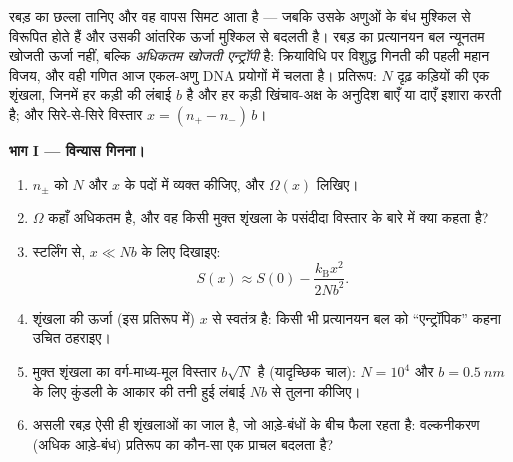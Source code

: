 \begin{problem}\label{pb:b3:microcanonical-ensemble:1}
रबड़ का छल्ला तानिए और वह वापस सिमट आता है --- जबकि उसके अणुओं के
बंध मुश्किल से विरूपित होते हैं और उसकी आंतरिक ऊर्जा मुश्किल से
बदलती है। रबड़ का प्रत्यानयन बल न्यूनतम खोजती ऊर्जा नहीं, बल्कि
\emph{अधिकतम खोजती एन्ट्रॉपी} है: क्रियाविधि पर विशुद्ध गिनती की
पहली महान विजय, और वही गणित आज एकल-अणु DNA प्रयोगों में चलता है।
प्रतिरूप: $N$ दृढ़ कड़ियों की एक शृंखला,
जिनमें हर कड़ी की लंबाई $b$ है और हर कड़ी खिंचाव-अक्ष के अनुदिश बाएँ
या दाएँ इशारा करती है; और सिरे-से-सिरे विस्तार $x = (n_+ - n_-)\,b$।

\medskip\noindent\textbf{भाग I --- विन्यास गिनना।}
\begin{enumerate}
  \item $n_\pm$ को $N$ और $x$ के पदों में व्यक्त कीजिए, और
         $\Omega(x)$ लिखिए।
  \item $\Omega$ कहाँ अधिकतम है, और वह किसी मुक्त शृंखला के पसंदीदा
        विस्तार के बारे में क्या कहता है?
  \item स्टर्लिंग से, $x \ll Nb$ के लिए दिखाइए:
        \[
        S(x) \approx S(0) - \frac{k_{\text{B}}x^2}{2Nb^2} .
        \]
  \item शृंखला की ऊर्जा (इस प्रतिरूप में) $x$ से स्वतंत्र है:
        किसी भी प्रत्यानयन बल को ``एन्ट्रॉपिक'' कहना उचित ठहराइए।
  \item मुक्त शृंखला का वर्ग-माध्य-मूल विस्तार $b\sqrt N$ है
        (यादृच्छिक चाल): $N = 10^4$ और $b = \qty{0.5}{nm}$ के लिए
        कुंडली के आकार की तनी हुई लंबाई $Nb$ से तुलना कीजिए।
  \item असली रबड़ ऐसी ही शृंखलाओं का जाल है, जो आड़े-बंधों के बीच
        फैला रहता है: वल्कनीकरण (अधिक आड़े-बंध) प्रतिरूप का कौन-सा
        एक प्राचल बदलता है?
\end{enumerate}


\end{problem}
